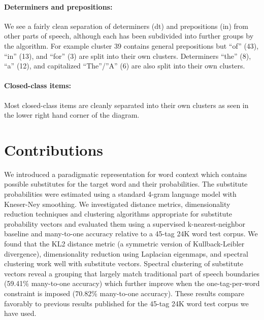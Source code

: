 \documentclass[11pt]{article}
\newcommand{\spectralResult}{59.41}
\newcommand{\collapseResult}{70.82}
\begin{document}
\paragraph{Determiners and prepositions:}  We see a fairly clean
separation of determiners ({\sc dt}) and prepositions ({\sc in}) from
other parts of speech, although each has been subdivided into further
groups by the algorithm.  For example cluster 39 contains general
prepositions but ``of'' (43), ``in'' (13), and ``for'' (3) are split
into their own clusters.  Determiners ``the'' (8), ``a'' (12), and
capitalized ``The''/''A'' (6) are also split into their own clusters.

\paragraph{Closed-class items:}  Most closed-class items are cleanly
separated into their own clusters as seen in the lower right hand
corner of the diagram.

\section{Contributions}
\label{sec:contrib}

We introduced a paradigmatic representation for word context which
contains possible substitutes for the target word and their
probabilities.  The substitute probabilities were estimated using a
standard 4-gram language model with Kneser-Ney smoothing.  We
investigated distance metrics, dimensionality reduction techniques and
clustering algorithms appropriate for substitute probability vectors
and evaluated them using a supervised k-nearest-neighbor baseline and
many-to-one accuracy relative to a 45-tag 24K word test corpus.  We
found that the KL2 distance metric (a symmetric version of
Kullback-Leibler divergence), dimensionality reduction using Laplacian
eigenmaps, and spectral clustering work well with substitute vectors.
Spectral clustering of substitute vectors reveal a grouping that
largely match traditional part of speech boundaries (\spectralResult\%
many-to-one accuracy) which further improve when the one-tag-per-word
constraint is imposed (\collapseResult\% many-to-one accuracy).  These
results compare favorably to previous results published for the 45-tag
24K word test corpus we have used.  



\end{document}
